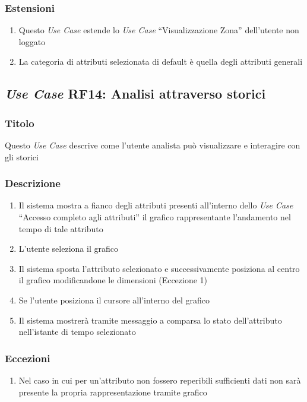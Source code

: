         \subsubsection{Estensioni}
            \begin{enumerate}
                \item Questo \textit{Use Case} estende lo \textit{Use Case} ``Visualizzazione Zona'' dell'utente non loggato
                \item La categoria di attributi selezionata di default è quella degli attributi generali
            \end{enumerate}

    \subsection{\textit{Use Case} RF14: Analisi attraverso storici}
        \subsubsection{Titolo}
            Questo \textit{Use Case} descrive come l'utente analista può visualizzare e interagire con gli storici
        \subsubsection{Descrizione}
            \begin{enumerate}
                \item Il sistema mostra a fianco degli attributi presenti all'interno dello \textit{Use Case} ``Accesso completo agli attributi'' il grafico rappresentante l'andamento nel tempo di tale attributo
                \item L'utente seleziona il grafico
                \item Il sistema sposta l'attributo selezionato e successivamente posiziona al centro il grafico modificandone le dimensioni (Eccezione 1)
                \item Se l'utente posiziona il cursore all'interno del grafico
                \item Il sistema mostrerà tramite messaggio a comparsa lo stato dell'attributo nell'istante di tempo selezionato
            \end{enumerate}
        \subsubsection{Eccezioni}
            \begin{enumerate}
                \item Nel caso in cui per un'attributo non fossero reperibili sufficienti dati non sarà presente la propria rappresentazione tramite grafico
            \end{enumerate}


